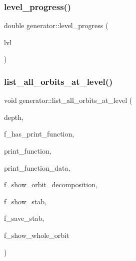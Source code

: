 \mbox{\label{classgenerator_a8e49be9e3025fd11427847e34c77024a}} 
\subsubsection{\texorpdfstring{level\+\_\+progress()}{level\_progress()}}
{\footnotesize\ttfamily double generator\+::level\+\_\+progress (\begin{DoxyParamCaption}\item[{\mbox{\hyperlink{galois_8h_a09fddde158a3a20bd2dcadb609de11dc}{I\+NT}}}]{lvl }\end{DoxyParamCaption})}

\mbox{\label{classgenerator_a650880bf92f9f2bf124d4ead2cc01f70}} 
\subsubsection{\texorpdfstring{list\+\_\+all\+\_\+orbits\+\_\+at\+\_\+level()}{list\_all\_orbits\_at\_level()}}
{\footnotesize\ttfamily void generator\+::list\+\_\+all\+\_\+orbits\+\_\+at\+\_\+level (\begin{DoxyParamCaption}\item[{\mbox{\hyperlink{galois_8h_a09fddde158a3a20bd2dcadb609de11dc}{I\+NT}}}]{depth,  }\item[{\mbox{\hyperlink{galois_8h_a09fddde158a3a20bd2dcadb609de11dc}{I\+NT}}}]{f\+\_\+has\+\_\+print\+\_\+function,  }\item[{void($\ast$)(\mbox{\hyperlink{galois_8h_a09fddde158a3a20bd2dcadb609de11dc}{I\+NT}} len, \mbox{\hyperlink{galois_8h_a09fddde158a3a20bd2dcadb609de11dc}{I\+NT}} $\ast$\mbox{\hyperlink{classgenerator_a5d2b65e2bd0e451744af1a47ba00bd96}{S}}, void $\ast$data)}]{print\+\_\+function,  }\item[{void $\ast$}]{print\+\_\+function\+\_\+data,  }\item[{\mbox{\hyperlink{galois_8h_a09fddde158a3a20bd2dcadb609de11dc}{I\+NT}}}]{f\+\_\+show\+\_\+orbit\+\_\+decomposition,  }\item[{\mbox{\hyperlink{galois_8h_a09fddde158a3a20bd2dcadb609de11dc}{I\+NT}}}]{f\+\_\+show\+\_\+stab,  }\item[{\mbox{\hyperlink{galois_8h_a09fddde158a3a20bd2dcadb609de11dc}{I\+NT}}}]{f\+\_\+save\+\_\+stab,  }\item[{\mbox{\hyperlink{galois_8h_a09fddde158a3a20bd2dcadb609de11dc}{I\+NT}}}]{f\+\_\+show\+\_\+whole\+\_\+orbit }\end{DoxyParamCaption})}


